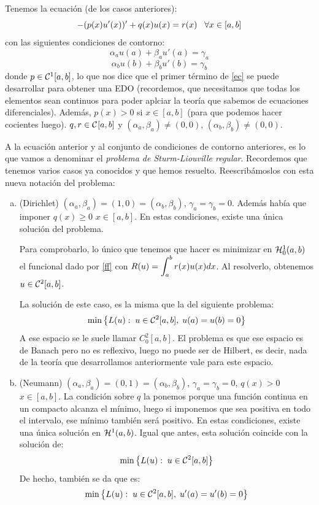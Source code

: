 Tenemos la ecuación (de los casos anteriores):
\begin{equation}\label{ec}
-(p(x)u'(x))'+q(x)u(x)=r(x) \espacio \forall x\in[a,b]
\end{equation}
con las siguientes condiciones de contorno:
\begin{equation}\label{eq:ca}
\alpha_au(a)+\beta_au'(a)=\gamma_a \tag{$c_a$}
\end{equation}
\begin{equation}\label{eq:cb}
\alpha_bu(b)+\beta_bu'(b)=\gamma_b \tag{$c_b$}
\end{equation}
donde $p\in\continuas[1]$, lo que nos dice que el primer término de \eqref{ec} se puede desarrollar para obtener una EDO (recordemos, que necesitamos que todas los elementos sean continuos para poder aplciar la teoría que sabemos de ecuaciones diferenciales). Además, $p(x)>0$ si $x\in[a,b]$ (para que podemos hacer cocientes luego). $q,r\in\continuas$ y $(\alpha_a,\beta_a)\neq(0,0)$, $(\alpha_b,\beta_b)\neq(0,0)$.

A la ecuación anterior y al conjunto de condiciones de contorno anteriores, es lo que vamos a denominar el \textit{problema de Sturm-Liouville regular}. Recordemos que tenemos varios casos ya conocidos y que hemos resuelto. Reescribámoslos con esta nueva notación del problema:
\begin{enumerate}[(a)]
\item (Dirichlet) $(\alpha_a,\beta_a)=(1,0)=(\alpha_b,\beta_b)$, $\gamma_a=\gamma_b=0$. Además había que imponer $q(x)\geq 0$ $x\in[a,b]$. En estas condiciones, existe una única solución del problema.

Para comprobarlo, lo único que tenemos que hacer es minimizar en $\sobolevcero{1}$ el funcional dado por \eqref{ff} con $R(u)=\integral{a}{b}{r(x)u(x)dx}$. Al resolverlo, obtenemos $u\in\continuas[2]$.

La solución de este caso, es la misma que la del siguiente problema:
\[
\min\left\{L(u):\; u\in\continuas[2],\; u(a)=u(b)=0\right\}
\]
A ese espacio se le suele llamar $C_0^2[a,b]$. El problema es que ese espacio es de Banach pero no es reflexivo, luego no puede ser de Hilbert, es decir, nada de la teoría que desarrollamos anteriormente vale para este espacio.

\item (Neumann) $(\alpha_a,\beta_a)=(0,1)=(\alpha_b,\beta_b)$, $\gamma_a=\gamma_b=0$, $q(x)>0$ $x\in[a,b].$ La condición sobre $q$ la ponemos porque una función continua en un compacto alcanza el mínimo, luego si imponemos que sea positiva en todo el intervalo, ese mínimo también será positivo. En estas condiciones, existe una única solución en $\sobolev{1}$. Igual que antes, esta solución coincide con la solución de:
\[
\min\left\{L(u):\; u\in\continuas[2]\right\}
\]
De hecho, también se da que es:
\[
\min\left\{L(u):\; u\in\continuas[2],\; u'(a)=u'(b)=0\right\}
\]
\end{enumerate}

